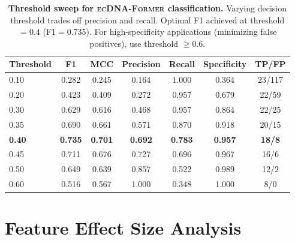 \documentclass{article}
\newcommand{\former}{\textsc{ecDNA-Former}}
\begin{document}
\begin{table}[ht]
\caption{\textbf{Threshold sweep for \former{} classification.} Varying decision threshold trades off precision and recall. Optimal F1 achieved at threshold $=0.4$ (F1$=$0.735). For high-specificity applications (minimizing false positives), use threshold $\geq 0.6$.}
\label{tab:threshold_app}
\centering
\small
\begin{tabular}{@{}lcccccc@{}}
\toprule
Threshold & F1 & MCC & Precision & Recall & Specificity & TP/FP \\
\midrule
0.10 & 0.282 & 0.245 & 0.164 & 1.000 & 0.364 & 23/117 \\
0.20 & 0.423 & 0.409 & 0.272 & 0.957 & 0.679 & 22/59 \\
0.30 & 0.629 & 0.616 & 0.468 & 0.957 & 0.864 & 22/25 \\
0.35 & 0.690 & 0.661 & 0.571 & 0.870 & 0.918 & 20/15 \\
\textbf{0.40} & \textbf{0.735} & \textbf{0.701} & \textbf{0.692} & \textbf{0.783} & \textbf{0.957} & \textbf{18/8} \\
0.45 & 0.711 & 0.676 & 0.727 & 0.696 & 0.967 & 16/6 \\
0.50 & 0.649 & 0.639 & 0.857 & 0.522 & 0.989 & 12/2 \\
0.60 & 0.516 & 0.567 & 1.000 & 0.348 & 1.000 & 8/0 \\
\bottomrule
\end{tabular}
\end{table}


\section{Feature Effect Size Analysis}
\label{app:features_effects}
\end{document}
